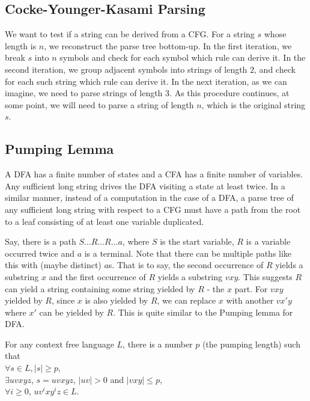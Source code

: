 \documentclass[11pt]{article}
\begin{document}
\subsection{Cocke-Younger-Kasami Parsing}

We want to test if a string can be derived from a CFG. For a string $s$ whose length is $n$, we
reconstruct the parse tree bottom-up. In the first iteration, we break $s$ into $n$ symbols and
check for each symbol which rule can derive it. In the second iteration, we group adjacent symbols
into strings of length $2$, and check for each such string which rule can derive it. In the next
iteration, as we can imagine, we need to parse strings of length $3$. As this procedure continues,
at some point, we will need to parse a string of length $n$, which is the original string $s$.

\subsection{Pumping Lemma}

A DFA has a finite number of states and a CFA has a finite number of variables. Any sufficient long
string drives the DFA visiting a state at least twice. In a similar manner, instead of a
computation in the case of a DFA, a parse tree of any sufficient long string with respect to a CFG
must have a path from the root to a leaf consisting of at least one variable duplicated.

Say, there is a path $S \dots R \dots R \dots a$, where $S$ is the start variable, $R$ is a
variable occurred twice and $a$ is a terminal. Note that there can be multiple paths like this with
(maybe distinct) $a$s. That is to say, the second occurrence of $R$ yields a substring $x$ and
the first occurrence of $R$ yields a substring $vxy$. This suggests $R$ can yield a string
containing some string yielded by $R$ - the $x$ part. For $vxy$ yielded by $R$, since $x$ is also
yielded by $R$, we can replace $x$ with another $vx'y$ where $x'$ can be yielded by $R$. This is
quite similar to the Pumping lemma for DFA.

\begin{theorem}
For any context free language $L$, there is a number $p$ (the pumping length) such that \\
$\forall s \in L, |s| \geq p$, \\
\indent $\exists uvxyz$, $s = uvxyz$, $|uv| > 0$ and $|vxy| \leq p$, \\
\indent\indent $\forall i \geq 0$, $uv^ixy^iz \in L$.
\end{theorem}
\end{document}
